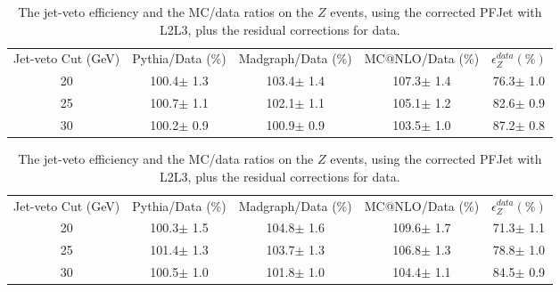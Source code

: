 \begin{table}[htbp]
\caption{The jet-veto efficiency and the MC/data ratios on the $Z$ events, 
using the uncorrected PFJet. 
}
\begin{center}
\label{tab:zeff_results}
\begin{tabular}{c|ccc|c}
\hline
\hline
Jet-veto Cut (GeV) & Pythia/Data (\%) & Madgraph/Data (\%) & MC@NLO/Data (\%) & $\epsilon_Z^{data} (\%)$ \\    
    20 & 100.4$\pm$ 1.3 & 103.4$\pm$ 1.4 &  107.3$\pm$ 1.4 &  76.3$\pm$ 1.0\\
    25 & 100.7$\pm$ 1.1 & 102.1$\pm$ 1.1 &  105.1$\pm$ 1.2 &  82.6$\pm$ 0.9\\
    30 & 100.2$\pm$ 0.9 & 100.9$\pm$ 0.9 &  103.5$\pm$ 1.0 &  87.2$\pm$ 0.8\\
\hline
\hline
\end{tabular}
\end{center}
\caption{
The jet-veto efficiency and the MC/data ratios on the $Z$ events, 
using the corrected PFJet with L2L3, plus the residual corrections for data. 
}
\begin{center}
\label{tab:zeff_jec_results}
\begin{tabular}{c|ccc|c}
\hline
\hline
Jet-veto Cut (GeV) & Pythia/Data (\%) & Madgraph/Data (\%) & MC@NLO/Data (\%) & $\epsilon_Z^{data} (\%)$ \\    
    20 & 100.3$\pm$ 1.5 & 104.8$\pm$ 1.6 &  109.6$\pm$ 1.7 &  71.3$\pm$ 1.1\\
    25 & 101.4$\pm$ 1.3 & 103.7$\pm$ 1.3 &  106.8$\pm$ 1.3 &  78.8$\pm$ 1.0\\
    30 & 100.5$\pm$ 1.0 & 101.8$\pm$ 1.0 &  104.4$\pm$ 1.1 &  84.5$\pm$ 0.9\\
\hline
\hline
\end{tabular}
\end{center}
\end{table}
